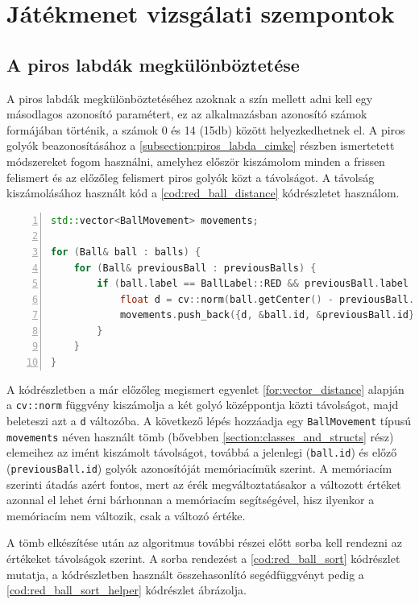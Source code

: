 \section{Játékmenet vizsgálati szempontok}
\subsection{A piros labdák megkülönböztetése}
A piros labdák megkülönböztetéséhez azoknak a szín mellett adni kell egy másodlagos azonosító paramétert, ez az alkalmazásban azonosító számok formájában történik, a számok 0 és 14 (15db) között helyezkedhetnek el. A piros golyók beazonosításához a \ref{subsection:piros_labda_cimke} részben ismertetett módszereket fogom használni, amelyhez először kiszámolom minden a frissen felismert és az előzőleg felismert piros golyók közt a távolságot. A távolság kiszámolásához használt kód a \ref{cod:red_ball_distance} kódrészletet használom.

\begin{codewrapper}
\begin{lstlisting}[language=C++, numbers=left, caption={Piros golyók közti távolság kiszámolása.}, label={cod:red_ball_distance}]
std::vector<BallMovement> movements;

for (Ball& ball : balls) {
    for (Ball& previousBall : previousBalls) {
        if (ball.label == BallLabel::RED && previousBall.label == BallLabel::RED) {
            float d = cv::norm(ball.getCenter() - previousBall.getCenter());
            movements.push_back({d, &ball.id, &previousBall.id});
        }
    }
}
\end{lstlisting}
\end{codewrapper}

\par A kódrészletben a már előzőleg megismert egyenlet \ref{for:vector_distance} alapján a \lstinline{cv::norm} függvény\cite{opencv_docs} kiszámolja a két golyó középpontja közti távolságot, majd beleteszi azt a \lstinline{d} változóba. A következő lépés hozzáadja egy \lstinline{BallMovement} típusú \lstinline{movements} néven használt tömb (bővebben \ref{section:classes_and_structs} rész) elemeihez az imént kiszámolt távolságot, továbbá a jelenlegi (\lstinline{ball.id}) és előző (\lstinline{previousBall.id}) golyók azonosítóját memóriacímük szerint. A memóriacím szerinti átadás azért fontos, mert az érék megváltoztatásakor a változott értéket azonnal el lehet érni bárhonnan a memóriacím segítségével, hisz ilyenkor a memóriacím nem változik, csak a változó értéke.
\par A tömb elkészítése után az algoritmus további részei előtt sorba kell rendezni az értékeket távolságok szerint. A sorba rendezést a \ref{cod:red_ball_sort} kódrészlet mutatja, a kódrészletben használt összehasonlító segédfüggvényt pedig a \ref{cod:red_ball_sort_helper} kódrészlet ábrázolja.

